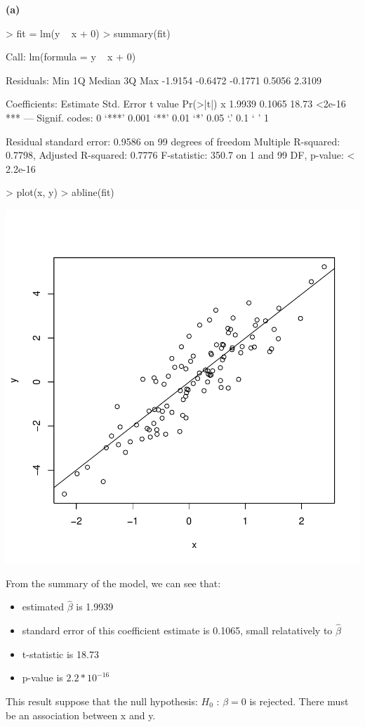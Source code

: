 \documentclass[a4paper]{article}
\renewcommand{\part}[1] {\vspace{.10in} {\bf (#1)}}
\begin{document}
\part{a}
\begin{Schunk}
\begin{Sinput}
> fit = lm(y ~ x + 0)
> summary(fit)
\end{Sinput}
\begin{Soutput}
Call:
lm(formula = y ~ x + 0)

Residuals:
    Min      1Q  Median      3Q     Max 
-1.9154 -0.6472 -0.1771  0.5056  2.3109 

Coefficients:
  Estimate Std. Error t value Pr(>|t|)    
x   1.9939     0.1065   18.73   <2e-16 ***
---
Signif. codes:  0 ‘***’ 0.001 ‘**’ 0.01 ‘*’ 0.05 ‘.’ 0.1 ‘ ’ 1

Residual standard error: 0.9586 on 99 degrees of freedom
Multiple R-squared:  0.7798,	Adjusted R-squared:  0.7776 
F-statistic: 350.7 on 1 and 99 DF,  p-value: < 2.2e-16
\end{Soutput}
\begin{Sinput}
> plot(x, y)
> abline(fit)
\end{Sinput}
\end{Schunk}
\includegraphics{lm-a}
\begin{enumerate}
{\color{red}
\item From the summary of the model, we can see that:
\begin{itemize}
\item estimated $\hat{\beta}$ is 1.9939
\item standard error of this coefficient estimate is 0.1065, small relatatively to $\hat{\beta}$
\item t-statistic is 18.73
\item p-value is $2.2 * 10^{-16}$
\end{itemize}
This result suppose that the null hypothesis: $H_0$ : $\beta = 0$ is rejected. There must be an association between x and y.
}
\end{enumerate}
\end{document}
